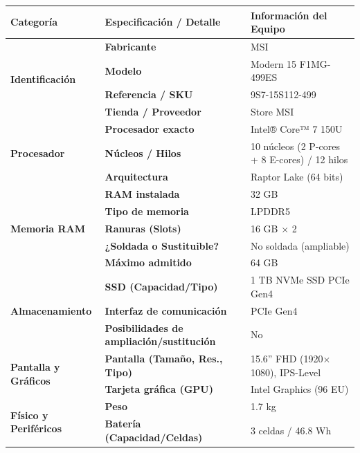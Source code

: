 \documentclass[11.5pt]{article}
\begin{document}
	\begin{table}[H]
		\centering
		\footnotesize
		\renewcommand{\arraystretch}{1.2}
		\begin{tabularx}{\textwidth}{|l|l|X|}
			\hline
			\textbf{Categoría} & \textbf{Especificación / Detalle} & \textbf{Información del Equipo} \\
			\hline
			\multirow{4}{*}{\textbf{Identificación}} 
			& \textbf{Fabricante} & MSI \\
			\cline{2-3}
			& \textbf{Modelo} & Modern 15 F1MG-499ES \\
			\cline{2-3}
			& \textbf{Referencia / SKU} & 9S7-15S112-499 \\
			\cline{2-3}
			& \textbf{Tienda / Proveedor} & Store MSI \\
			\hline
			\multirow{3}{*}{\textbf{Procesador}} 
			& \textbf{Procesador exacto} & Intel® Core™ 7 150U \\
			\cline{2-3}
			& \textbf{Núcleos / Hilos} & 10 núcleos (2 P-cores + 8 E-cores) / 12 hilos \\
			\cline{2-3}
			& \textbf{Arquitectura} & Raptor Lake (64 bits) \\
			\hline
			\multirow{5}{*}{\textbf{Memoria RAM}} 
			& \textbf{RAM instalada} & 32 GB \\
			\cline{2-3}
			& \textbf{Tipo de memoria} & LPDDR5 \\
			\cline{2-3}
			& \textbf{Ranuras (Slots)} & 16 GB \(\times\) 2 \\
			\cline{2-3}
			& \textbf{¿Soldada o Sustituible?} & No soldada (ampliable) \\
			\cline{2-3}
			& \textbf{Máximo admitido} & 64 GB \\
			\hline
			\multirow{3}{*}{\textbf{Almacenamiento}} 
			& \textbf{SSD (Capacidad/Tipo)} & 1 TB NVMe SSD PCIe Gen4 \\
			\cline{2-3}
			& \textbf{Interfaz de comunicación} & PCIe Gen4 \\
			\cline{2-3}
			& \textbf{Posibilidades de ampliación/sustitución} & No \\
			\hline
			\multirow{2}{*}{\textbf{Pantalla y Gráficos}} 
			& \textbf{Pantalla (Tamaño, Res., Tipo)} & 15.6'' FHD (1920\(\times\)1080), IPS-Level \\
			\cline{2-3}
			& \textbf{Tarjeta gráfica (GPU)} & Intel Graphics (96 EU) \\
			\hline
			\multirow{4}{*}{\textbf{Físico y Periféricos}} 
			& \textbf{Peso} & 1.7 kg \\
			\cline{2-3}
			& \textbf{Batería (Capacidad/Celdas)} & 3 celdas / 46.8 Wh \\

\end{tabularx}
\end{table}
\end{document}

